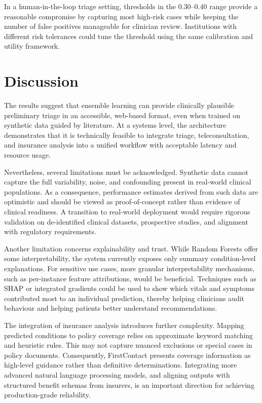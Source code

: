 \documentclass[conference]{IEEEtran}
\begin{document}
In a human-in-the-loop triage setting, thresholds in the 0.30--0.40 range provide a reasonable compromise by capturing most high-risk cases while keeping the number of false positives manageable for clinician review. Institutions with different risk tolerances could tune the threshold using the same calibration and utility framework.

\section{Discussion}

The results suggest that ensemble learning can provide clinically plausible preliminary triage in an accessible, web-based format, even when trained on synthetic data guided by literature. At a systems level, the architecture demonstrates that it is technically feasible to integrate triage, teleconsultation, and insurance analysis into a unified workflow with acceptable latency and resource usage.

Nevertheless, several limitations must be acknowledged. Synthetic data cannot capture the full variability, noise, and confounding present in real-world clinical populations. As a consequence, performance estimates derived from such data are optimistic and should be viewed as proof-of-concept rather than evidence of clinical readiness. A transition to real-world deployment would require rigorous validation on de-identified clinical datasets, prospective studies, and alignment with regulatory requirements.

Another limitation concerns explainability and trust. While Random Forests offer some interpretability, the system currently exposes only summary condition-level explanations. For sensitive use cases, more granular interpretability mechanisms, such as per-instance feature attributions, would be beneficial. Techniques such as SHAP or integrated gradients could be used to show which vitals and symptoms contributed most to an individual prediction, thereby helping clinicians audit behaviour and helping patients better understand recommendations.

The integration of insurance analysis introduces further complexity. Mapping predicted conditions to policy coverage relies on approximate keyword matching and heuristic rules. This may not capture nuanced exclusions or special cases in policy documents. Consequently, FirstContact presents coverage information as high-level guidance rather than definitive determinations. Integrating more advanced natural language processing models, and aligning outputs with structured benefit schemas from insurers, is an important direction for achieving production-grade reliability.
\end{document}
